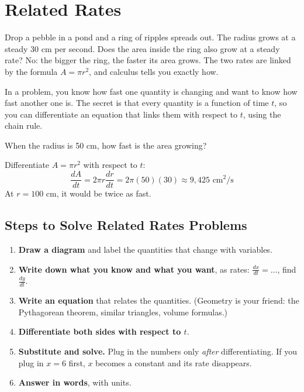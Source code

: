 \chapter{Related Rates}
Drop a pebble in a pond and a ring of ripples spreads out. The radius
grows at a steady 30 cm per second. Does the area inside the ring also
grow at a steady rate? No: the bigger the ring, the faster its area
grows. The two rates are linked by the formula $A = \pi r^2$, and calculus
tells you exactly how.

In a  problem, you know how fast one quantity is
changing and want to know how fast another one is. The secret is that
every quantity is a function of time $t$, so you can differentiate an
equation that links them with respect to $t$, using the chain rule.

\begin{Worked}
\begin{Problem}
When the radius is 50 cm, how fast is
the area growing?
\end{Problem}
\begin{Solution}
Differentiate $A = \pi r^2$ with respect to $t$:
$$\frac{dA}{dt} = 2\pi r \frac{dr}{dt} = 2\pi (50)(30) \approx 9{,}425 \text{ cm}^2\text{/s}$$
At $r = 100$ cm, it would be twice as fast.
\end{Solution}
\end{Worked}

\section{Steps to Solve Related Rates Problems}

\begin{enumerate}
\item \textbf{Draw a diagram} and label the quantities that change with
variables.
\item \textbf{Write down what you know and what you want}, as rates:
$\frac{dx}{dt} = \ldots$, find $\frac{dy}{dt}$.
\item \textbf{Write an equation} that relates the quantities. (Geometry is
your friend: the Pythagorean theorem, similar triangles, volume formulas.)
\item \textbf{Differentiate both sides with respect to $t$}.
\item \textbf{Substitute and solve.} Plug in the numbers only
\emph{after} differentiating. If you plug in $x = 6$ first, $x$ becomes a
constant and its rate disappears.
\item \textbf{Answer in words}, with units.
\end{enumerate}

